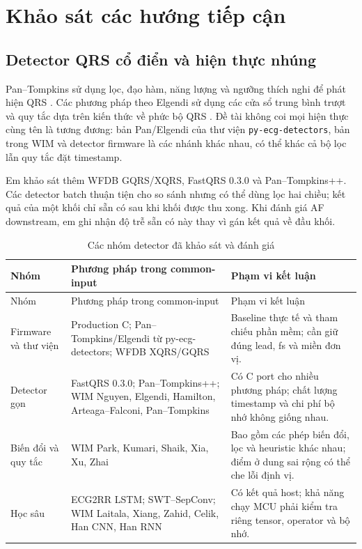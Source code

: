 \documentclass[12pt,a4paper,oneside]{report}
\begin{document}
\chapter{Khảo sát các hướng tiếp cận}
\section{Detector QRS cổ điển và hiện thực nhúng}
Pan--Tompkins sử dụng lọc, đạo hàm, năng lượng và ngưỡng thích nghi để phát hiện QRS \cite{pan1985}. Các phương pháp theo Elgendi sử dụng các cửa sổ trung bình trượt và quy tắc dựa trên kiến thức về phức bộ QRS \cite{elgendi2013}. Đề tài không coi mọi hiện thực cùng tên là tương đương: bản Pan/Elgendi của thư viện \texttt{py-ecg-detectors}, bản trong WIM và detector firmware là các nhánh khác nhau, có thể khác cả bộ lọc lẫn quy tắc đặt timestamp.

Em khảo sát thêm WFDB GQRS/XQRS, FastQRS 0.3.0 và Pan--Tompkins++. Các detector batch thuận tiện cho so sánh nhưng có thể dùng lọc hai chiều; kết quả của một khối chỉ sẵn có sau khi khối được thu xong. Khi đánh giá AF downstream, em ghi nhận độ trễ sẵn có này thay vì gán kết quả về đầu khối.

\begin{longtable}{L{3.1cm}L{6.7cm}L{4.9cm}}
\caption{Các nhóm detector đã khảo sát và đánh giá}\label{tab:surveyqrs}\\
\toprule Nhóm & Phương pháp trong common-input & Phạm vi kết luận\\\midrule\endfirsthead
\toprule Nhóm & Phương pháp trong common-input & Phạm vi kết luận\\\midrule\endhead
Firmware và thư viện & Production C; Pan--Tompkins/Elgendi từ py-ecg-detectors; WFDB XQRS/GQRS & Baseline thực tế và tham chiếu phần mềm; cần giữ đúng lead, fs và miền đơn vị.\\
Detector gọn & FastQRS 0.3.0; Pan--Tompkins++; WIM Nguyen, Elgendi, Hamilton, Arteaga--Falconi, Pan--Tompkins & Có C port cho nhiều phương pháp; chất lượng timestamp và chi phí bộ nhớ không giống nhau.\\
Biến đổi và quy tắc & WIM Park, Kumari, Shaik, Xia, Xu, Zhai & Bao gồm các phép biến đổi, lọc và heuristic khác nhau; điểm ở dung sai rộng có thể che lỗi định vị.\\
Học sâu & ECG2RR LSTM; SWT--SepConv; WIM Laitala, Xiang, Zahid, Celik, Han CNN, Han RNN & Có kết quả host; khả năng chạy MCU phải kiểm tra riêng tensor, operator và bộ nhớ.\\
\bottomrule
\end{longtable}
\end{document}
